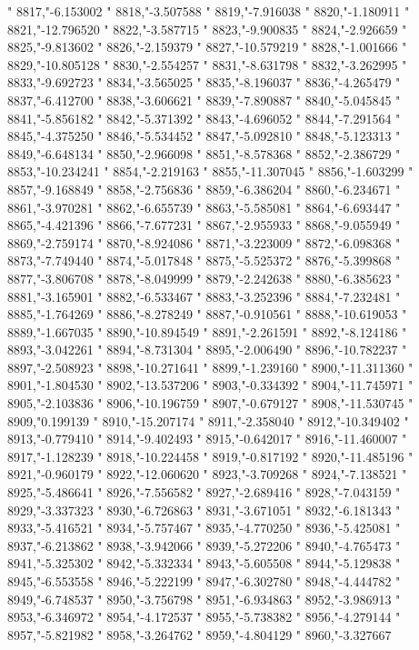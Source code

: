 "
8817,"-6.153002
"
8818,"-3.507588
"
8819,"-7.916038
"
8820,"-1.180911
"
8821,"-12.796520
"
8822,"-3.587715
"
8823,"-9.900835
"
8824,"-2.926659
"
8825,"-9.813602
"
8826,"-2.159379
"
8827,"-10.579219
"
8828,"-1.001666
"
8829,"-10.805128
"
8830,"-2.554257
"
8831,"-8.631798
"
8832,"-3.262995
"
8833,"-9.692723
"
8834,"-3.565025
"
8835,"-8.196037
"
8836,"-4.265479
"
8837,"-6.412700
"
8838,"-3.606621
"
8839,"-7.890887
"
8840,"-5.045845
"
8841,"-5.856182
"
8842,"-5.371392
"
8843,"-4.696052
"
8844,"-7.291564
"
8845,"-4.375250
"
8846,"-5.534452
"
8847,"-5.092810
"
8848,"-5.123313
"
8849,"-6.648134
"
8850,"-2.966098
"
8851,"-8.578368
"
8852,"-2.386729
"
8853,"-10.234241
"
8854,"-2.219163
"
8855,"-11.307045
"
8856,"-1.603299
"
8857,"-9.168849
"
8858,"-2.756836
"
8859,"-6.386204
"
8860,"-6.234671
"
8861,"-3.970281
"
8862,"-6.655739
"
8863,"-5.585081
"
8864,"-6.693447
"
8865,"-4.421396
"
8866,"-7.677231
"
8867,"-2.955933
"
8868,"-9.055949
"
8869,"-2.759174
"
8870,"-8.924086
"
8871,"-3.223009
"
8872,"-6.098368
"
8873,"-7.749440
"
8874,"-5.017848
"
8875,"-5.525372
"
8876,"-5.399868
"
8877,"-3.806708
"
8878,"-8.049999
"
8879,"-2.242638
"
8880,"-6.385623
"
8881,"-3.165901
"
8882,"-6.533467
"
8883,"-3.252396
"
8884,"-7.232481
"
8885,"-1.764269
"
8886,"-8.278249
"
8887,"-0.910561
"
8888,"-10.619053
"
8889,"-1.667035
"
8890,"-10.894549
"
8891,"-2.261591
"
8892,"-8.124186
"
8893,"-3.042261
"
8894,"-8.731304
"
8895,"-2.006490
"
8896,"-10.782237
"
8897,"-2.508923
"
8898,"-10.271641
"
8899,"-1.239160
"
8900,"-11.311360
"
8901,"-1.804530
"
8902,"-13.537206
"
8903,"-0.334392
"
8904,"-11.745971
"
8905,"-2.103836
"
8906,"-10.196759
"
8907,"-0.679127
"
8908,"-11.530745
"
8909,"0.199139
"
8910,"-15.207174
"
8911,"-2.358040
"
8912,"-10.349402
"
8913,"-0.779410
"
8914,"-9.402493
"
8915,"-0.642017
"
8916,"-11.460007
"
8917,"-1.128239
"
8918,"-10.224458
"
8919,"-0.817192
"
8920,"-11.485196
"
8921,"-0.960179
"
8922,"-12.060620
"
8923,"-3.709268
"
8924,"-7.138521
"
8925,"-5.486641
"
8926,"-7.556582
"
8927,"-2.689416
"
8928,"-7.043159
"
8929,"-3.337323
"
8930,"-6.726863
"
8931,"-3.671051
"
8932,"-6.181343
"
8933,"-5.416521
"
8934,"-5.757467
"
8935,"-4.770250
"
8936,"-5.425081
"
8937,"-6.213862
"
8938,"-3.942066
"
8939,"-5.272206
"
8940,"-4.765473
"
8941,"-5.325302
"
8942,"-5.332334
"
8943,"-5.605508
"
8944,"-5.129838
"
8945,"-6.553558
"
8946,"-5.222199
"
8947,"-6.302780
"
8948,"-4.444782
"
8949,"-6.748537
"
8950,"-3.756798
"
8951,"-6.934863
"
8952,"-3.986913
"
8953,"-6.346972
"
8954,"-4.172537
"
8955,"-5.738382
"
8956,"-4.279144
"
8957,"-5.821982
"
8958,"-3.264762
"
8959,"-4.804129
"
8960,"-3.327667
